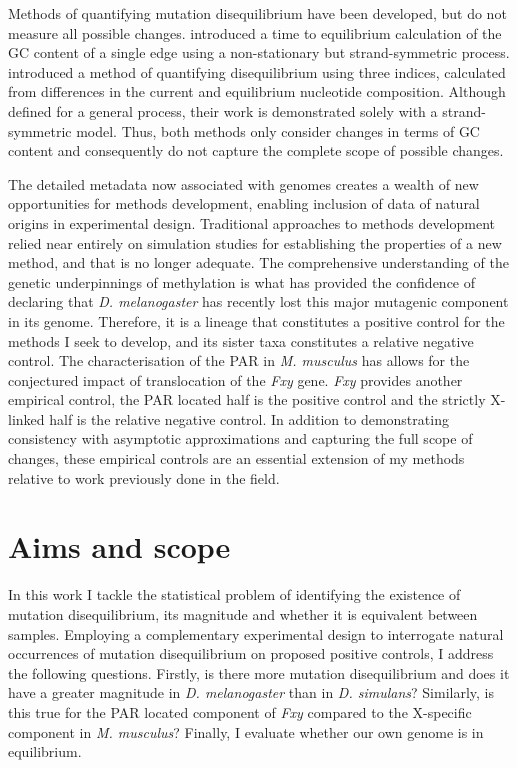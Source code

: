 Methods of quantifying mutation disequilibrium have been developed, but do not measure all possible changes. \cite{Singh2009StrongDrosophila} introduced a time to equilibrium calculation of the GC content of a single \gls{edge} using a non-stationary but strand-symmetric process. \cite{Squartini2008QuantifyingProcess} introduced a method of quantifying disequilibrium using three indices, calculated from differences in the current and equilibrium nucleotide composition. Although defined for a general process, their work is demonstrated solely with a strand-symmetric model. Thus, both methods only consider changes in terms of GC content and consequently do not capture the complete scope of possible changes.

The detailed metadata now associated with genomes creates a wealth of new opportunities for methods development, enabling inclusion of data of natural origins in experimental design. Traditional approaches to methods development relied near entirely on simulation studies for establishing the properties of a new method, and that is no longer adequate. The comprehensive understanding of the genetic underpinnings of methylation is what has provided the confidence of declaring that \textit{D. melanogaster} has recently lost this major mutagenic component in its genome. Therefore, it is a lineage that constitutes a positive control for the methods I seek to develop, and its sister taxa constitutes a relative negative control. The characterisation of the PAR in \textit{M. musculus} has allows for the conjectured impact of translocation of the \textit{Fxy} gene. \textit{Fxy} provides another empirical control, the PAR located half is the positive control and the strictly X-linked half is the relative negative control. In addition to demonstrating consistency with asymptotic approximations and capturing the full scope of changes, these empirical controls are an essential extension of my methods relative to work previously done in the field. 

\section{Aims and scope}

In this work I tackle the statistical problem of identifying the existence of mutation disequilibrium, its magnitude and whether it is equivalent between samples. Employing a complementary experimental design to interrogate natural occurrences of mutation disequilibrium on proposed positive controls, I address the following questions. Firstly, is there more mutation disequilibrium and does it have a greater magnitude in \textit{D. melanogaster} than in \textit{D. simulans}? Similarly, is this true for the PAR located component of \textit{Fxy} compared to the X-specific component in \textit{M. musculus}? Finally, I evaluate whether our own genome is in equilibrium. 


